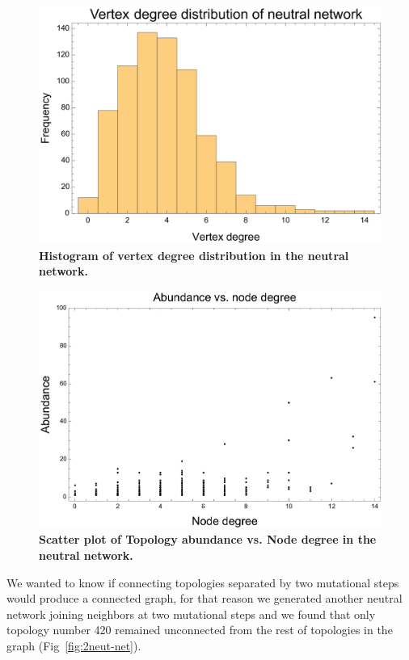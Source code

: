 \documentclass[10pt,letterpaper]{article}
\begin{document}
\begin{figure}[!h]
 \includegraphics[width=\textwidth]{figures/results/neutral-network-degree-distribution}
 \caption{\bf Histogram of vertex degree distribution in the neutral network.}
 \label{fig:deg-dist}
\end{figure}

\begin{figure}[!h]
 \includegraphics[width=\textwidth]{figures/results/abundance-vs-node-degree}
 \caption{\bf Scatter plot of Topology abundance vs. Node degree in the neutral
 network.}
 \label{fig:ab-deg}
\end{figure}

We wanted to know if connecting topologies separated by two mutational steps
would produce a connected graph, for that reason we generated another neutral
network joining neighbors at two mutational steps and we found that only 
topology number 420 remained unconnected from the rest of topologies in the 
graph (Fig~\ref{fig:2neut-net}).
\end{document}
